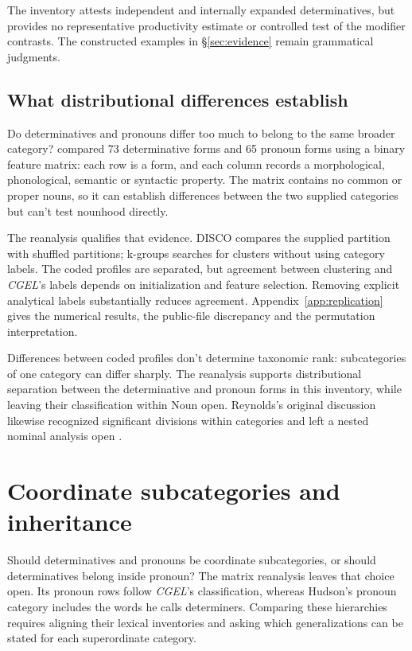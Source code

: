 \documentclass[12pt]{article}
\begin{document}
The inventory attests independent and internally expanded determinatives, but provides no representative productivity estimate or controlled test of the modifier contrasts. The constructed examples in §\ref{sec:evidence} remain grammatical judgments.

\subsection{What distributional differences establish}

Do determinatives and pronouns differ too much to belong to the same broader category? \textcite{reynolds2021} compared 73 determinative forms and 65 pronoun forms using a binary feature matrix: each row is a form, and each column records a morphological, phonological, semantic or syntactic property. The matrix contains no common or proper nouns, so it can establish differences between the two supplied categories but can't test nounhood directly.

The reanalysis qualifies that evidence. DISCO compares the supplied partition with shuffled partitions; k-groups searches for clusters without using category labels. The coded profiles are separated, but agreement between clustering and \textit{CGEL}'s labels depends on initialization and feature selection. Removing explicit analytical labels substantially reduces agreement. Appendix~\ref{app:replication} gives the numerical results, the public-file discrepancy and the permutation interpretation.

Differences between coded profiles don't determine taxonomic rank: subcategories of one category can differ sharply. The reanalysis supports distributional separation between the determinative and pronoun forms in this inventory, while leaving their classification within Noun open. Reynolds's original discussion likewise recognized significant divisions within categories and left a nested nominal analysis open \citep{reynolds2021}.

\section{Coordinate subcategories and inheritance}\label{sec:inheritance}

Should determinatives and pronouns be coordinate subcategories, or should determinatives belong inside pronoun? The matrix reanalysis leaves that choice open. Its pronoun rows follow \textit{CGEL}'s classification, whereas Hudson's pronoun category includes the words he calls determiners. Comparing these hierarchies requires aligning their lexical inventories and asking which generalizations can be stated for each superordinate category.
\end{document}
